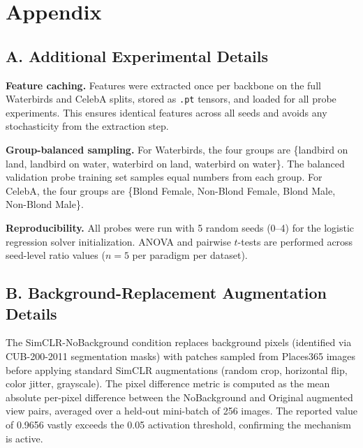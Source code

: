 \section*{Appendix}
\label{sec:appendix}

\subsection*{A. Additional Experimental Details}

\textbf{Feature caching.} Features were extracted once per backbone on the full Waterbirds and CelebA splits, stored as \texttt{.pt} tensors, and loaded for all probe experiments. This ensures identical features across all seeds and avoids any stochasticity from the extraction step.

\textbf{Group-balanced sampling.} For Waterbirds, the four groups are \{landbird on land, landbird on water, waterbird on land, waterbird on water\}. The balanced validation probe training set samples equal numbers from each group. For CelebA, the four groups are \{Blond Female, Non-Blond Female, Blond Male, Non-Blond Male\}.

\textbf{Reproducibility.} All probes were run with 5 random seeds (0--4) for the logistic regression solver initialization. ANOVA and pairwise $t$-tests are performed across seed-level ratio values ($n=5$ per paradigm per dataset).

\subsection*{B. Background-Replacement Augmentation Details}

The SimCLR-NoBackground condition replaces background pixels (identified via CUB-200-2011 segmentation masks) with patches sampled from Places365 images before applying standard SimCLR augmentations (random crop, horizontal flip, color jitter, grayscale). The pixel difference metric is computed as the mean absolute per-pixel difference between the NoBackground and Original augmented view pairs, averaged over a held-out mini-batch of 256 images. The reported value of 0.9656 vastly exceeds the 0.05 activation threshold, confirming the mechanism is active.

